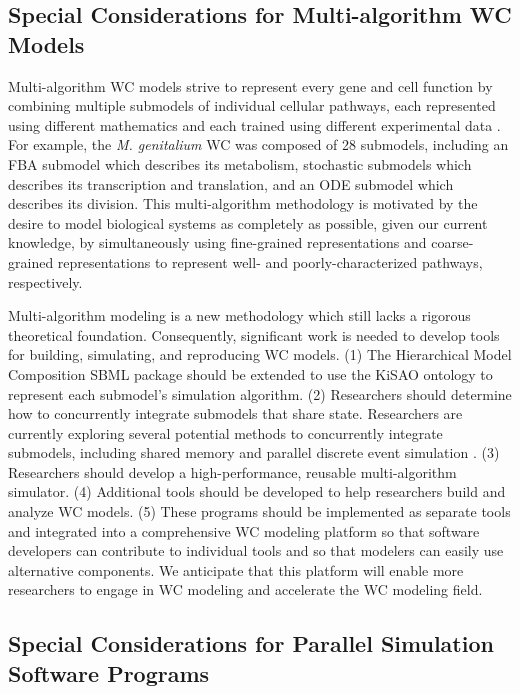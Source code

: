 \documentclass[journal,transmag,twoside]{IEEEtran}
\begin{document}
\subsection{Special Considerations for Multi-algorithm WC Models}
Multi-algorithm WC models strive to represent every gene and cell function by combining multiple submodels of individual cellular pathways, each represented using different mathematics and each trained using different experimental data \cite{Karr2015, macklin2014future, carrera2015build}. For example, the \textit{M. genitalium} WC was composed of 28 submodels, including an FBA submodel which describes its metabolism, stochastic submodels which describes its transcription and translation, and an ODE submodel which describes its division. This multi-algorithm methodology is motivated by the desire to model biological systems as completely as possible, given our current knowledge, by simultaneously using fine-grained representations and coarse-grained representations to represent well- and poorly-characterized pathways, respectively.

Multi-algorithm modeling is a new methodology which still lacks a rigorous theoretical foundation. Consequently, significant work is needed to develop tools for building, simulating, and reproducing WC models. (1) The Hierarchical Model Composition SBML package should be extended to use the KiSAO ontology \cite{courtot2011controlled} to represent each submodel's simulation algorithm. (2) Researchers should determine how to concurrently integrate submodels that share state. Researchers are currently exploring several potential methods to concurrently integrate submodels, including shared memory and parallel discrete event simulation \cite{Goldberg2016}. (3) Researchers should develop a high-performance, reusable multi-algorithm simulator. (4) Additional tools should be developed to help researchers build and analyze WC models. (5) These programs should be implemented as separate tools and integrated into a comprehensive WC modeling platform so that software developers can contribute to individual tools and so that modelers can easily use alternative components. We anticipate that this platform will enable more researchers to engage in WC modeling and accelerate the WC modeling field.

\subsection{Special Considerations for Parallel Simulation Software Programs}
\end{document}
